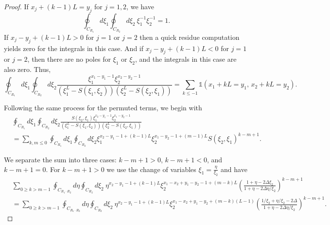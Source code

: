 \documentclass[10pt,a4paper]{amsart}
\begin{document}
\begin{proof}
If $x_j + (k-1)L = y_j$ for $j=1,2$, we have 
\begin{equation}
    \oint_{C_{R_1}}d\xi_1\oint_{C_{R_2}}d\xi_2  \ \xi_1^{-1}\xi_2^{-1} = 1.
\end{equation}
If $x_j - y_j + (k-1)L>0$ for $j=1$ or $j=2$ then a quick residue computation yields zero for the integrals in this case. And if $x_j-y_j+(k-1)L<0$ for $j=1$ or $j=2$, then there are no poles for $\xi_1$ or $\xi_2$, and the integrals in this case are also zero. Thus, 
\begin{equation}
    \oint_{C_{R_1}}d\xi_1\oint_{C_{R_2}}d\xi_2 \frac{\xi_1^{x_1-y_1-1}\xi_2^{x_2-y_2-1}}{\left(\xi_1^L - S(\xi_1,\xi_2) \right)\left(\xi_2^L - S(\xi_2,\xi_1) \right)}=\sum_{k\leq -1}\mathds{1}\left(x_1+kL=y_1, \, x_2+kL=y_2\right).
\end{equation}

Following the same process for the permuted terms, we begin with
\begin{equation}
    \begin{split}
        &\oint_{C_{R_1}}d\xi_1\oint_{C_{R_2}}d\xi_2 \frac{S(\xi_2,\xi_1)\xi_1^{x_2-y_1-1}\xi_2^{x_1-y_2-1}}{\left(\xi_1^L - S(\xi_1,\xi_2) \right)\left(\xi_2^L - S(\xi_2,\xi_1) \right)} \\
        &= \sum_{k,m\leq 0} \oint_{C_{R_1}}d\xi_1\oint_{C_{R_2}}d\xi_2 \xi_1^{x_2-y_1-1+(k-1)L}\xi_2^{x_1-y_2-1+(m-1)L}S(\xi_2,\xi_1)^{k-m+1}.
    \end{split}
\end{equation}

We separate the sum into three cases: $k-m+1>0$, $k-m+1<0$, and $k-m+1 = 0$. For $k-m+1>0$ we use the change of variables $\xi_1=\frac{\eta}{\xi_2}$ and have 
\begin{equation}
    \begin{split}
        &\sum_{0\geq k>m-1} \oint_{C_{R_1 \cdot R_2}}d\eta\oint_{C_{R_2}}d\xi_2 \ \eta^{x_2-y_1-1+(k-1)L}\xi_2^{x_1-x_2+y_1-y_2-1+(m-k)L}\left(\frac{1+\eta-2\Delta\xi_2}{1+\eta-2\Delta\eta/\xi_2}\right)^{k-m+1} \\
        &=\sum_{0\geq k>m-1}\oint_{C_{R_1\cdot R_2}}d\eta\oint_{C_{R_2}}d\xi_2 \ \eta^{x_2-y_1-1+(k-1)L}\xi_2^{x_1-x_2+y_1-y_2+(m-k)(L-1)}\left(\frac{1/\xi_2+\eta/\xi_2-2\Delta}{1+\eta-2\Delta\eta/\xi_2}\right)^{k-m+1}.
    \end{split}
\end{equation}


\end{proof}
\end{document}

